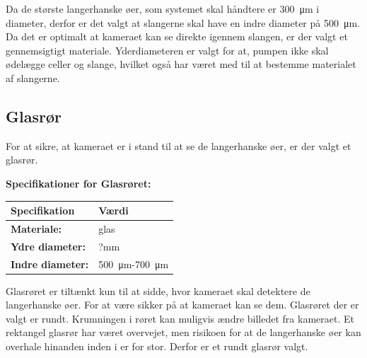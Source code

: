 Da de største langerhanske øer, som systemet skal håndtere er \SI{300}{\micro\metre} i diameter, derfor er det valgt at slangerne skal have en indre diameter på \SI{500}{\micro\metre}. Da det er optimalt at kameraet kan se direkte igennem slangen, er der valgt et gennemsigtigt materiale. Yderdiameteren er valgt for at, pumpen ikke skal ødelægge celler og slange, hvilket også har været med til at bestemme materialet af slangerne. 

\subsection{Glasrør}
For at sikre, at kameraet er i stand til at se de langerhanske øer, er der valgt et glasrør.

\textbf{Specifikationer for Glasrøret:} 
\begin{center}
		\begin{longtable}{ | m{6.5cm} | m{6.5cm}| } 
			\hline
			\textbf{Specifikation} &\textbf{Værdi} \\ 
			\hline
			\textbf{Materiale:} & glas \\ 
			\hline
			\textbf{Ydre diameter:} & ?mm  \\ 
			\hline
			\textbf{Indre diameter:} & \SI{500}{\micro\metre}-\SI{700}{\micro\metre}  \\ 
			\hline			
		\end{longtable}
\end{center}
Glasrøret er tiltænkt kun til at sidde, hvor kameraet skal detektere de langerhanske øer. For at være sikker på at kameraet kan se dem. Glasrøret der er valgt er rundt. Krumningen i røret kan muligvis ændre billedet fra kameraet. Et rektangel glasrør har været overvejet, men risikoen for at de langerhanske øer kan overhale hinanden inden i er for stor. Derfor er et rundt glasrør valgt.





